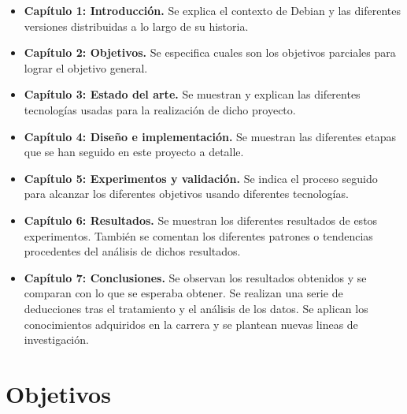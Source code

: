 \documentclass[a4paper, 12pt]{book}
\begin{document}
\begin{itemize}
  \item \textbf {Capítulo 1: Introducción.} Se explica el contexto de Debian y las diferentes versiones distribuidas a lo largo de su historia.
  
  \item \textbf {Capítulo 2: Objetivos.} Se especifica cuales son los objetivos parciales para lograr el objetivo general.
  
  \item \textbf {Capítulo 3: Estado del arte.} Se muestran y explican las diferentes tecnologías usadas para la realización de dicho proyecto.
  
  \item \textbf {Capítulo 4: Diseño e implementación.} Se muestran las diferentes etapas que se han seguido en este proyecto a detalle.
  
  \item \textbf {Capítulo 5: Experimentos y validación.} Se indica el proceso seguido para alcanzar los diferentes objetivos usando diferentes tecnologías.
  
  \item \textbf {Capítulo 6: Resultados.} Se muestran los diferentes resultados de estos experimentos. También se comentan los diferentes patrones o tendencias procedentes del análisis de dichos resultados.
  
  \item \textbf {Capítulo 7: Conclusiones.} Se observan los resultados obtenidos y se comparan con lo que se esperaba obtener. Se realizan una serie de deducciones tras el tratamiento y el análisis de los datos. Se aplican los conocimientos adquiridos en la carrera y se plantean nuevas lineas de investigación.
  
\end{itemize}






\cleardoublepage %
\chapter{Objetivos} %
\label{chap:objetivos} %
\end{document}
